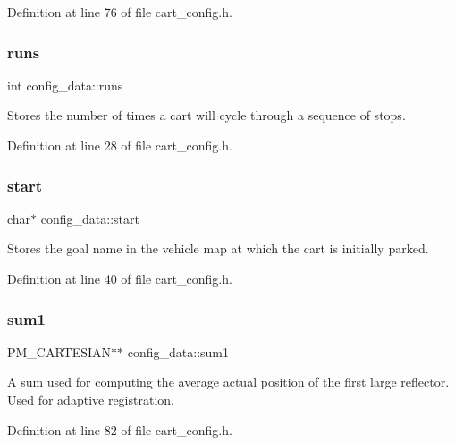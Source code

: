 Definition at line 76 of file cart\+\_\+config.\+h.

\mbox{\label{structconfig__data_adc9d0db49d5276dd09e63901adf2d3df}} 
\subsubsection{\texorpdfstring{runs}{runs}}
{\footnotesize\ttfamily int config\+\_\+data\+::runs}

Stores the number of times a cart will cycle through a sequence of stops. 

Definition at line 28 of file cart\+\_\+config.\+h.

\mbox{\label{structconfig__data_a9553e6685a392714b4d08b4081145565}} 
\subsubsection{\texorpdfstring{start}{start}}
{\footnotesize\ttfamily char$\ast$ config\+\_\+data\+::start}

Stores the goal name in the vehicle map at which the cart is initially parked. 

Definition at line 40 of file cart\+\_\+config.\+h.

\mbox{\label{structconfig__data_a16e482f7e73e9fe797fbf4b380894aac}} 
\subsubsection{\texorpdfstring{sum1}{sum1}}
{\footnotesize\ttfamily P\+M\+\_\+\+C\+A\+R\+T\+E\+S\+I\+AN$\ast$$\ast$ config\+\_\+data\+::sum1}

A sum used for computing the average actual position of the first large reflector. Used for adaptive registration. 

Definition at line 82 of file cart\+\_\+config.\+h.

\mbox{\label{structconfig__data_a7b4b5f88455123fafa44f8d48b2ebf3d}} 
